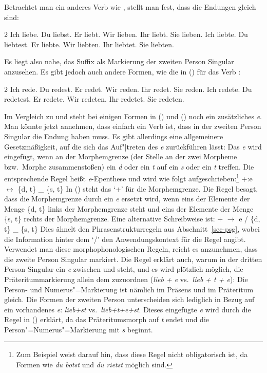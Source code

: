 \noindent
Betrachtet man ein anderes Verb wie \zb {}, stellt man fest, dass die
Endungen gleich sind:
\begin{multicols}{2}
\eal
\ex Ich liebe.
\ex Du  liebst.
\ex Er  liebt.
\ex Wir lieben.
\ex Ihr liebt.
\ex Sie lieben.
\zl
\eal
\ex Ich liebte.
\ex Du  liebtest.
\ex Er  liebte.
\ex Wir liebten.
\ex Ihr liebtet.
\ex Sie liebten.
\zl
\end{multicols}
\noindent
Es liegt also nahe, \zb das Suffix  als Markierung der zweiten Person Singular
anzusehen. Es gibt jedoch auch andere Formen, wie die in () für das Verb :
\begin{multicols}{2}
\eal
\ex Ich rede.
\ex Du  redest.
\ex Er  redet.
\ex Wir reden.
\ex Ihr redet.
\ex Sie reden.
\zl
\eal
\ex Ich redete.
\ex Du  redetest.
\ex Er  redete.
\ex Wir redeten.
\ex Ihr redetet.
\ex Sie redeten.
\zl
\end{multicols}
\noindent
Im Vergleich zu  und  steht bei einigen Formen in ()
und () noch ein zusätzliches \emph{e}. Man könnte jetzt annehmen, dass 
einfach ein Verb ist, dass in der zweiten Person Singular die Endung  haben
muss. Es gibt allerdings eine allgemeinere Gesetzmäßigkeit, auf die sich das Auf"|treten
des \emph{e} zurückführen lässt: Das \emph{e} wird eingefügt, wenn an der Morphemgrenze
(der Stelle an der zwei Morpheme bzw.\ Morphe zusammenstoßen) ein \emph{d} oder ein \emph{t} auf ein
\emph{s} oder ein \emph{t} treffen. Die entsprechende Regel heißt \emph{e}-Epenthese
und wird wie folgt aufgeschrieben:\footnote{
  Zum Beispiel \citet[]{Eisenberg98a} weist darauf hin, dass diese Regel nicht
  obligatorisch ist, da Formen wie \emph{du botst} und \emph{du rietst} möglich sind.%
}
\ea
\label{Regel-e-einfuegung}
+:e $\leftrightarrow$ \{d, t\} \_ \{s, t\}
\z
In () steht das `+' für die Morphemgrenze. Die Regel besagt, dass die Morphemgrenze
durch ein \emph{e} ersetzt wird, wenn eins der Elemente der Menge \{d, t\} links der Morphemgrenze
steht und eins der Elemente der Menge \{s, t\} rechts der Morphemgrenze.
Eine alternative Schreibweise ist:
\ea
+ $\to$ e / \{d, t\} \_ \{s, t\}
\z
Dies ähnelt den Phrasenstrukturregeln aus Abschnitt~\ref{sec-psg}, wobei die Information hinter dem `/'
den Anwendungskontext für die Regel angibt. Verwendet man diese morphophonologischen Regeln,
reicht es anzunehmen, dass  die zweite Person Singular markiert. Die Regel erklärt auch,
warum in der dritten Person Singular ein \emph{e} zwischen  und  steht,
und es wird plötzlich möglich, die Präteritummarkierung allein dem  zuzuordnen 
(\emph{lieb + e} vs.\ \emph{lieb + t + e}): Die Person- und
Numerus"=Markierung ist nämlich im Präsens und im Präteritum gleich. Die Formen der zweiten Person unterscheiden sich
lediglich in Bezug auf ein vorhandenes \emph{e}: \emph{lieb+st} vs.\ \emph{lieb+t+e+st}. Dieses
eingefügte \emph{e} wird durch die Regel in () erklärt, da das Präteritumsmorph
auf \emph{t} endet und die Person"=Numerus"=Markierung mit \emph{s} beginnt.

